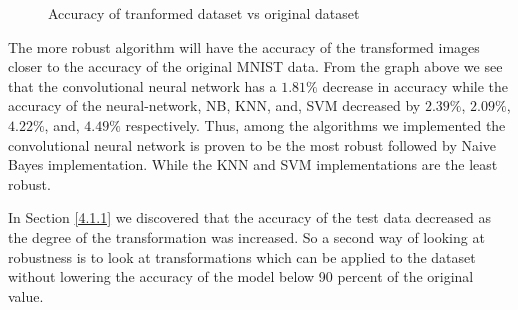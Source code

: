\Robustness
    
\begin{figure}[H]
\caption{Accuracy of tranformed dataset vs original dataset}
\label{img:transformedaccuracy}
\end{figure}

The more robust algorithm will have the accuracy of the transformed images closer to the accuracy of the original MNIST data. From the graph above we see that the convolutional neural network has a $1.81\%$ decrease in accuracy while the accuracy of the neural-network, NB, KNN, and, SVM decreased by $2.39\%$, $2.09\%$, $4.22\%$, and, $4.49\%$ respectively. Thus, among the algorithms we implemented the convolutional neural network is proven to be the most robust followed by Naive Bayes implementation. While the KNN and SVM implementations are the least robust.

In Section \ref{4.1.1} we discovered that the accuracy of the test data decreased as the degree of the transformation was increased. So a second way of looking at robustness is to look at transformations which can be applied to the dataset without lowering the accuracy of the model below 90 percent of the original value.




